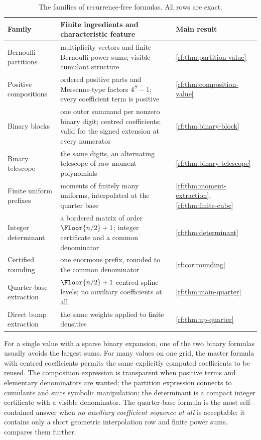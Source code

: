 \documentclass[11pt,oneside]{article}
\theoremstyle{plain}
\theoremstyle{definition}
\theoremstyle{remark}
\begin{document}
\begin{table}[htbp]
\centering\small
\begin{tabularx}{\textwidth}{@{}p{}Xp{}@{}}
\toprule
Family & Finite ingredients and characteristic feature & Main result\\
\midrule
Bernoulli partitions & multiplicity vectors and finite Bernoulli power sums; visible cumulant structure & \cref{rf:thm:partition-value}\\
Positive compositions & ordered positive parts and Mersenne-type factors $4^{S}-1$; every coefficient term is positive & \cref{rf:thm:composition-value}\\
Binary blocks & one outer summand per nonzero binary digit; centred coefficients; valid for the signed extension at every numerator & \cref{rf:thm:binary-block}\\
Binary telescope & the same digits, an alternating telescope of raw-moment polynomials & \cref{rf:thm:binary-telescope}\\
Finite uniform prefixes & moments of finitely many uniforms, interpolated at the quarter base & \cref{rf:thm:moment-extraction}, \cref{rf:thm:finite-cube}\\
Integer determinant & a bordered matrix of order $\Floor{n/2}+1$; integer certificate and a common denominator & \cref{rf:thm:determinant}\\
Certified rounding & one enormous prefix, rounded to the common denominator & \cref{rf:cor:rounding}\\
Quarter-base extraction & $\Floor{n/2}+1$ centred spline levels; no auxiliary coefficients at all & \cref{rf:thm:main-quarter}\\
Direct bump extraction & the same weights applied to finite densities & \cref{rf:thm:up-quarter}\\
\bottomrule
\end{tabularx}
\caption{The families of recurrence-free formulas.  All rows are exact.}
\label{rf:tab:intro-map}
\end{table}

For a single value with a sparse binary expansion, one of the two binary
formulas usually avoids the largest sums.  For many values on one grid, the
master formula with centred coefficients permits the same explicitly
computed coefficients to be reused.  The composition expression is
transparent when positive terms and elementary denominators are wanted; the
partition expression connects to cumulants and suits symbolic manipulation;
the determinant is a compact integer certificate with a visible denominator.
The quarter-base formula is the most self-contained answer when \emph{no
auxiliary coefficient sequence at all} is acceptable: it contains only a
short geometric interpolation row and finite power sums.
 compares them further.
\end{document}

